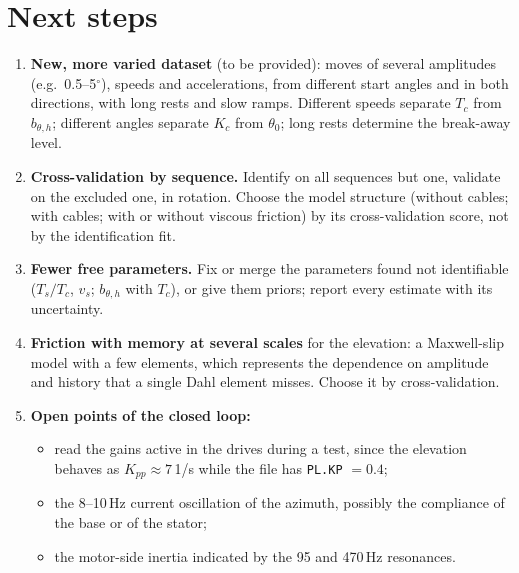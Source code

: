 \documentclass[10pt,a4paper]{article}
\numberwithin{equation}{section}
\begin{document}
\section{Next steps}\label{sec:next}
\begin{enumerate}
\item \textbf{New, more varied dataset} (to be provided): moves of several amplitudes (e.g.\ 0.5--5$^\circ$), speeds and accelerations, from different start angles and in both directions, with long rests and slow ramps. Different speeds separate $T_c$ from $b_{\theta,h}$; different angles separate $K_c$ from $\theta_0$; long rests determine the break-away level.
\item \textbf{Cross-validation by sequence.} Identify on all sequences but one, validate on the excluded one, in rotation. Choose the model structure (without cables; with cables; with or without viscous friction) by its cross-validation score, not by the identification fit.
\item \textbf{Fewer free parameters.} Fix or merge the parameters found not identifiable ($T_s/T_c$, $v_s$; $b_{\theta,h}$ with $T_c$), or give them priors; report every estimate with its uncertainty.
\item \textbf{Friction with memory at several scales} for the elevation: a Maxwell-slip model with a few elements, which represents the dependence on amplitude and history that a single Dahl element misses. Choose it by cross-validation.
\item \textbf{Open points of the closed loop:}
  \begin{itemize}
  \item read the gains active in the drives during a test, since the elevation behaves as $K_{pp}\approx7$\,1/s while the file has \texttt{PL.KP} $=0.4$;
  \item the 8--10\,Hz current oscillation of the azimuth, possibly the compliance of the base or of the stator;
  \item the motor-side inertia indicated by the 95 and 470\,Hz resonances.
  \end{itemize}
\end{enumerate}

\appendix
\end{document}
